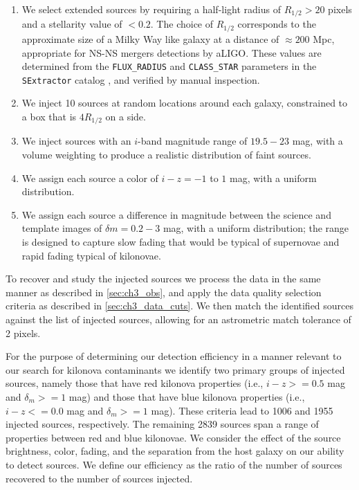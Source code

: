 \begin{enumerate}
\item We select extended sources by requiring a half-light radius of $R_{1/2} > 20$ pixels and a stellarity value of $<0.2$. The choice of $R_{1/2}$ corresponds to the approximate size of a Milky Way like galaxy at a distance of $\approx 200$ Mpc, appropriate for NS-NS mergers detections by aLIGO. These values are determined from the {\tt FLUX\_RADIUS} and {\tt CLASS\_STAR} parameters in the {\tt SExtractor} catalog \citep{BertinArnouts96}, and verified by manual inspection.

\item We inject 10 sources at random locations around each galaxy, constrained to a box that is $4R_{1/2}$ on a side.

\item We inject sources with an $i$-band magnitude range of $19.5-23$ mag, with a volume weighting to produce a realistic distribution of faint sources.

\item We assign each source a color of $i-z=-1$ to $1$ mag, with a uniform distribution.

\item We assign each source a difference in magnitude between the science and template images of $\delta m= 0.2-3$ mag, with a uniform distribution; the range is designed to capture slow fading that would be typical of supernovae and rapid fading typical of kilonovae.

\end{enumerate}

\clearpage
To recover and study the injected sources we process the data in the same manner as described in \cref{sec:ch3_obs}, and apply the data quality selection criteria as described in \cref{sec:ch3_data_cuts}. We then match the identified sources against the list of injected sources, allowing for an astrometric match tolerance of 2 pixels.

For the purpose of determining our detection efficiency in a manner relevant to our search for kilonova contaminants we identify two primary groups of injected sources, namely those that have red kilonova properties (i.e., $i-z>=0.5$ mag and $\delta_m>=1$ mag) and those that have blue kilonova properties (i.e., $i-z<=0.0$ mag and $\delta_m>=1$ mag). These criteria lead to 1006 and 1955 injected sources, respectively. The remaining 2839 sources span a range of properties between red and blue kilonovae. We consider the effect of the source brightness, color, fading, and the separation from the host galaxy on our ability to detect sources. We define our efficiency as the ratio of the number of sources recovered to the number of sources injected.


